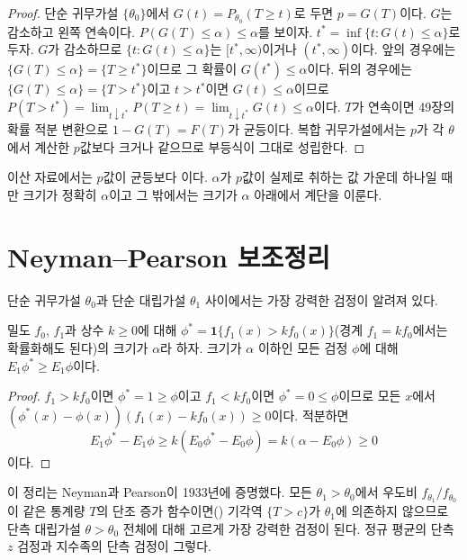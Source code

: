 \begin{proof}
단순 귀무가설 $\{\theta_0\}$에서 $G(t)=P_{\theta_0}(T\ge t)$로 두면 $p=G(T)$이다. $G$는 감소하고 왼쪽 연속이다. $P(G(T)\le\alpha)\le\alpha$를 보이자. $t^\ast=\inf\{t:G(t)\le\alpha\}$로 두자. $G$가 감소하므로 $\{t:G(t)\le\alpha\}$는 $[t^\ast,\infty)$이거나 $(t^\ast,\infty)$이다. 앞의 경우에는 $\{G(T)\le\alpha\}=\{T\ge t^\ast\}$이므로 그 확률이 $G(t^\ast)\le\alpha$이다. 뒤의 경우에는 $\{G(T)\le\alpha\}=\{T>t^\ast\}$이고 $t>t^\ast$이면 $G(t)\le\alpha$이므로 $P(T>t^\ast)=\lim_{t\downarrow t^\ast}P(T\ge t)=\lim_{t\downarrow t^\ast}G(t)\le\alpha$이다. $T$가 연속이면 49장의 확률 적분 변환으로 $1-G(T)=F(T)$가 균등이다. 복합 귀무가설에서는 $p$가 각 $\theta$에서 계산한 $p$값보다 크거나 같으므로 부등식이 그대로 성립한다.
\end{proof}

이산 자료에서는 $p$값이 균등보다 이다. $\alpha$가 $p$값이 실제로 취하는 값 가운데 하나일 때만 크기가 정확히 $\alpha$이고 그 밖에서는 크기가 $\alpha$ 아래에서 계단을 이룬다.

\section{Neyman--Pearson 보조정리}
\label{sec:neyman-pearson}

단순 귀무가설 $\theta_0$과 단순 대립가설 $\theta_1$ 사이에서는 가장 강력한 검정이 알려져 있다.

\begin{theorem}
\label{thm:neyman-pearson}
밀도 $f_0$, $f_1$과 상수 $k\ge0$에 대해 $\phi^\ast=\mathbf 1\{f_1(x)>kf_0(x)\}$(경계 $f_1=kf_0$에서는 확률화해도 된다)의 크기가 $\alpha$라 하자. 크기가 $\alpha$ 이하인 모든 검정 $\phi$에 대해 $E_1\phi^\ast\ge E_1\phi$이다.
\end{theorem}

\begin{proof}
$f_1>kf_0$이면 $\phi^\ast=1\ge\phi$이고 $f_1<kf_0$이면 $\phi^\ast=0\le\phi$이므로 모든 $x$에서 $(\phi^\ast(x)-\phi(x))(f_1(x)-kf_0(x))\ge0$이다. 적분하면
\[
E_1\phi^\ast-E_1\phi\ge k(E_0\phi^\ast-E_0\phi)=k(\alpha-E_0\phi)\ge0
\]
이다.
\end{proof}

이 정리는 Neyman과 Pearson이 1933년에 증명했다\cite{neyman1933}. 모든 $\theta_1>\theta_0$에서 우도비 $f_{\theta_1}/f_{\theta_0}$이 같은 통계량 $T$의 단조 증가 함수이면() 기각역 $\{T>c\}$가 $\theta_1$에 의존하지 않으므로 단측 대립가설 $\theta>\theta_0$ 전체에 대해 고르게 가장 강력한 검정이 된다. 정규 평균의 단측 $z$ 검정과 지수족의 단측 검정이 그렇다.

